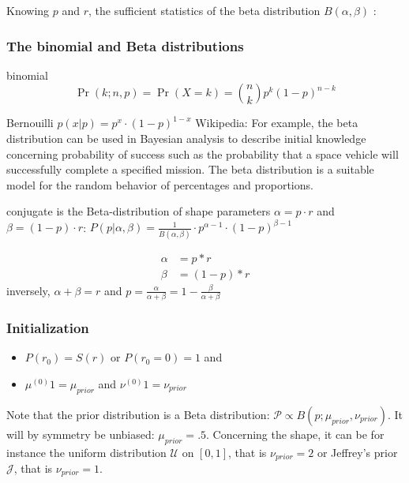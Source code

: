 \documentclass[12pt,english]{article}%
\newcommand{\eq}[1]{\begin{equation*}#1\end{equation*}}
\newcommand{\eqs}[1]{\begin{align*}#1\end{align*}}
\newcommand{\Jj}{\mathcal{J}}
\newcommand{\Pp}{\mathcal{P}}
\newcommand{\Uu}{\mathcal{U}}
\begin{document}
Knowing $p$ and $r$, the sufficient statistics of the beta distribution $B(\alpha, \beta)$ :


\subsubsection{The binomial and Beta distributions}

binomial
\eq{
\Pr(k;n,p) = \Pr(X = k) = {n\choose k}p^k(1-p)^{n-k}
}


Bernouilli $p(x | p) = p^x \cdot (1-p)^{1-x}$
Wikipedia: For example, the beta distribution can be used in Bayesian analysis to describe initial knowledge concerning probability of success such as the probability that a space vehicle will successfully complete a specified mission. The beta distribution is a suitable model for the random behavior of percentages and proportions.

conjugate is the Beta-distribution of shape parameters $\alpha = p\cdot r$ and $\beta = (1- p)\cdot r$:
$ P(p | \alpha, \beta ) = \frac{1}{B(\alpha, \beta)} \cdot p^{\alpha -1} \cdot (1-p)^{\beta - 1} $

\eqs{
        \alpha &= p*r \\
        \beta  &= (1-p)*r
    }
inversely, $\alpha + \beta = r$ and $p = \frac{\alpha}{\alpha +\beta} = 1- \frac{\beta}{\alpha + \beta}$



\subsubsection{Initialization}

	\begin{itemize}
		\item    $P(r_0)= S(r)$ or $P(r_0=0)=1$ and
		\item    $\mu^{(0)}1 = \mu_{prior}$ and $\nu^{(0)}1 = \nu_{prior}$
	\end{itemize}

Note that the prior distribution is a Beta distribution:
$\Pp\propto B(p; \mu_{prior}, \nu_{prior})$.
It will by symmetry be unbiased: $\mu_{prior}=.5$.
Concerning the shape, it can be for instance
the uniform distribution $\Uu$ on $ [ 0, 1 ] $, that is $\nu_{prior}=2$ or
Jeffrey's prior $\Jj$, that is $\nu_{prior}=1$.

\end{document}
